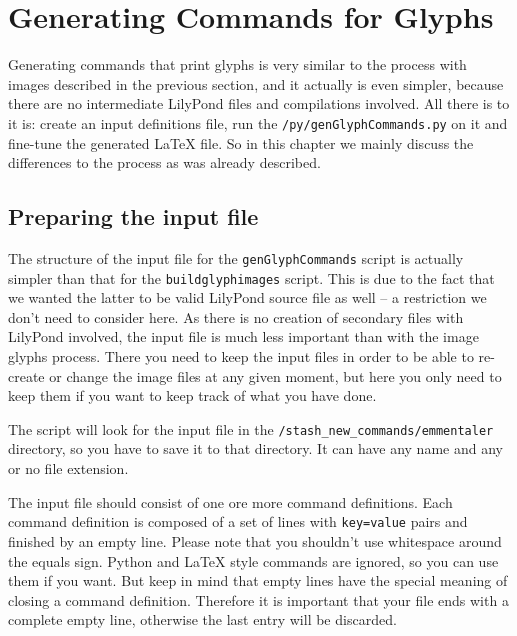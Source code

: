 \documentclass{OLLbook}
\begin{document}
\section{Generating Commands for \emmentaler Glyphs}
\label{sec:generating_commands_emmentaler}

Generating commands that print \emmentaler glyphs is very similar to the process with images described in the previous section, and it actually is even simpler, because there are no intermediate LilyPond files and compilations involved.
All there is to it is: create an input definitions file, run the \texttt{/py/genGlyphCommands.py} on it and fine-tune the generated \LaTeX{} file.
So in this chapter we mainly discuss the differences to the process as was already described.


\subsection{Preparing the input file}
\label{subsec:GGC_preparing_input_file}

The structure of the input file for the \texttt{genGlyphCommands} script is actually simpler than that for the \texttt{buildglyphimages} script.
This is due to the fact that we wanted the latter to be valid LilyPond source file as well -- a restriction we don't need to consider here.
As there is no creation of secondary files with LilyPond involved, the input file is much less important than with the image glyphs process.
There you need to keep the input files in order to be able to re-create or change the image files at any given moment, but here you only need to keep them if you want to keep track of what you have done.

The script will look for the input file in the \texttt{/stash\_new\_commands/emmentaler} directory, so you have to save it to that directory.
It can have any name and any or no file extension.

The input file should consist of one ore more command definitions.
Each command definition is composed of a set of lines with \texttt{key=value} pairs and finished by an empty line.
Please note that you shouldn't use whitespace around the equals sign.
Python and \LaTeX{} style commands are ignored, so you can use them if you want.
But keep in mind that empty lines have the special meaning of closing a command definition.
Therefore it is important that your file ends with a complete empty line, otherwise the last entry will be discarded.
\end{document}
